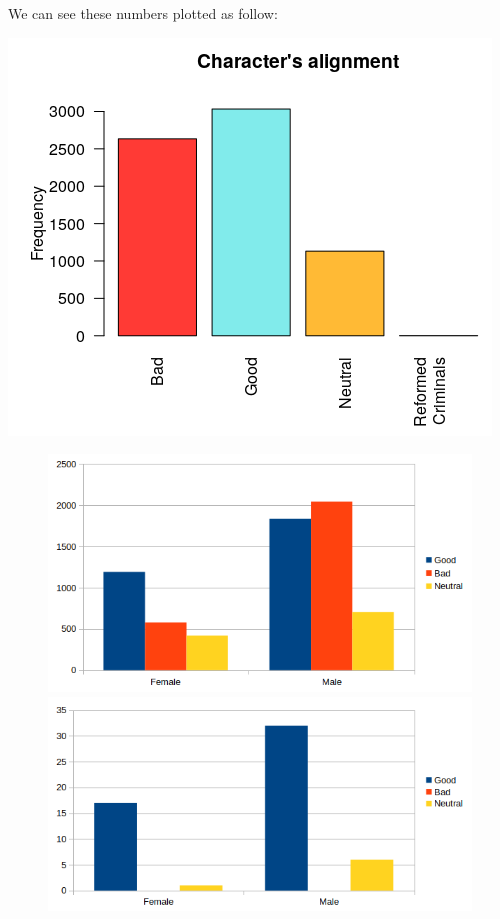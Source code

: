 We can see these numbers plotted as follow:
\begin{center}
\includegraphics[width=0.4\linewidth]{img/alignment.png}
\end{center}
 
\begin{figure}[!htb]
    \centering
    \begin{minipage}{.47\textwidth}
        \centering
        \includegraphics[width=\linewidth]{img/alignment_gender_total.png}
    \end{minipage}%
     \begin{minipage}{.06\textwidth}
      \hfill
    \end{minipage}%
    \begin{minipage}{0.52\textwidth}
       \centering
       \includegraphics[width=\linewidth]{img/alignment_gender.png}
    \end{minipage}
\end{figure}

